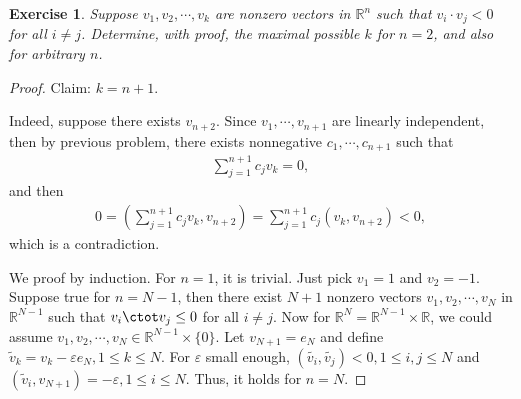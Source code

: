 \documentclass[11pt]{book}
\newtheorem{exercise}{Exercise}[section]
\theoremstyle{definition}
\numberwithin{equation}{subsection}
\begin{document}
\medskip

\begin{exercise}
Suppose $v_1, v_2, \cdots, v_k$ are nonzero vectors in $\mathbb{R}^n$ such that $v_i \cdot v_j < 0$ for all $i \neq j$. Determine, with proof, the maximal possible $k$ for $n = 2$, and also for arbitrary $n$.
\end{exercise}
\begin{proof}
Claim: $k = n + 1$. 

Indeed, suppose there exists $v_{n+2}$. Since $v_1, \cdots, v_{n+1}$ are linearly independent, then by previous problem, there exists nonnegative $c_1, \cdots, c_{n+1}$ such that
\begin{align*}
    \sum^{n+1}_{j=1} c_j v_k = 0,
\end{align*}
and then
\begin{align*}
    0 = \left(\sum^{n+1}_{j=1} c_j v_k, v_{n+2}\right) = \sum^{n+1}_{j=1} c_j \left(v_k, v_{n+2} \right) < 0,
\end{align*}
which is a contradiction. 

We proof by induction. For $n = 1$, it is trivial. Just pick $v_1 = 1$ and $v_2 = -1$. Suppose true for $n = N - 1$, then there exist $N+1$ nonzero vectors $v_1, v_2, \cdots, v_{N}$ in $\mathbb{R}^{N-1}$ such that $v_i \ctot v_j \leq 0$ for all $i \neq j$. Now for $\mathbb{R}^N = \mathbb{R}^{N-1} \times \mathbb{R}$, we could assume $v_1, v_2, \cdots, v_{N} \in \mathbb{R}^{N-1} \times \{0\}$. Let $v_{N+1} = e_N$ and define $\widetilde{v}_k = v_k - \varepsilon e_N, 1 \leq k \leq N$. For $\varepsilon$ small enough, $\left(\tilde{v_i}, \tilde{v_j}\right) < 0, 1 \leq i,j \leq N$ and $\left(\tilde{v}_i, v_{N+1} \right) = - \varepsilon, 1 \leq i \leq N$. Thus, it holds for $n = N$.
\end{proof}

\medskip
\end{document}
